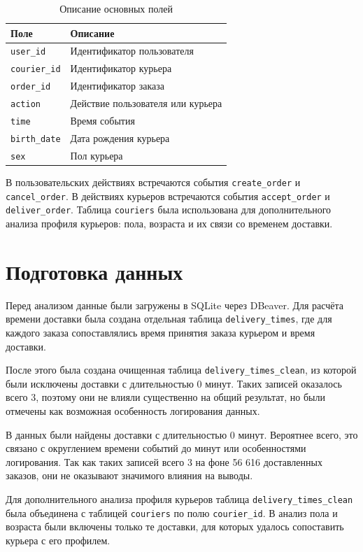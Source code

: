 \documentclass[12pt,a4paper]{article}
\begin{document}
\begin{table}[H]
\centering
\caption{Описание основных полей}
\begin{tabular}{p{4cm} p{10cm}}
\toprule
\textbf{Поле} & \textbf{Описание} \\
\midrule
\texttt{user\_id} & Идентификатор пользователя \\
\texttt{courier\_id} & Идентификатор курьера \\
\texttt{order\_id} & Идентификатор заказа \\
\texttt{action} & Действие пользователя или курьера \\
\texttt{time} & Время события \\
\texttt{birth\_date} & Дата рождения курьера \\
\texttt{sex} & Пол курьера \\
\bottomrule
\end{tabular}
\end{table}

В пользовательских действиях встречаются события \texttt{create\_order} и \texttt{cancel\_order}. В действиях курьеров встречаются события \texttt{accept\_order} и \texttt{deliver\_order}. Таблица \texttt{couriers} была использована для дополнительного анализа профиля курьеров: пола, возраста и их связи со временем доставки.

\section{Подготовка данных}

Перед анализом данные были загружены в SQLite через DBeaver. Для расчёта времени доставки была создана отдельная таблица \texttt{delivery\_times}, где для каждого заказа сопоставлялись время принятия заказа курьером и время доставки.

После этого была создана очищенная таблица \texttt{delivery\_times\_clean}, из которой были исключены доставки с длительностью 0 минут. Таких записей оказалось всего 3, поэтому они не влияли существенно на общий результат, но были отмечены как возможная особенность логирования данных.

В данных были найдены доставки с длительностью 0 минут. Вероятнее всего, это связано с округлением времени событий до минут или особенностями логирования. Так как таких записей всего 3 на фоне 56 616 доставленных заказов, они не оказывают значимого влияния на выводы.

Для дополнительного анализа профиля курьеров таблица \texttt{delivery\_times\_clean} была объединена с таблицей \texttt{couriers} по полю \texttt{courier\_id}. В анализ пола и возраста были включены только те доставки, для которых удалось сопоставить курьера с его профилем.
\end{document}
